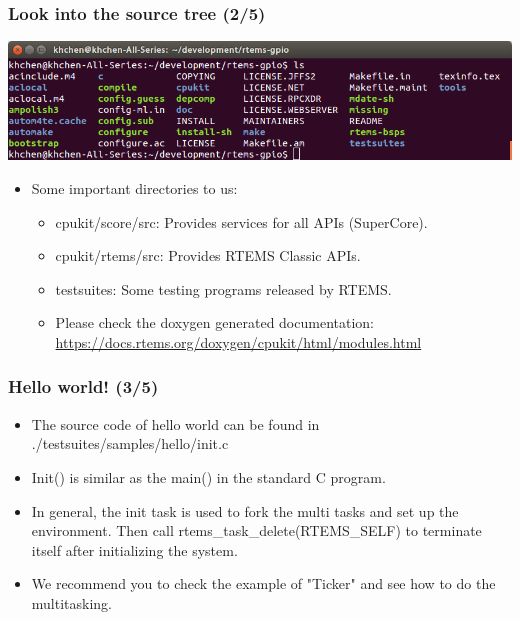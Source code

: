 \documentclass[t]{beamer}
\begin{document}
\begin{frame}
\frametitle{Look into the source tree (2/5)}
    \begin{center}
      \includegraphics[width=\textwidth]{sourcetree}
    \end{center}
\begin{itemize}
\item Some important directories to us:
\begin{itemize}
\item cpukit/score/src: Provides services for all APIs (SuperCore).
\item cpukit/rtems/src: Provides RTEMS Classic APIs.
\item testsuites: Some testing programs released by RTEMS.
\item Please check the doxygen generated documentation: \url{https://docs.rtems.org/doxygen/cpukit/html/modules.html}
\end{itemize}
\end{itemize}
\end{frame}

\begin{frame}
\frametitle{Hello world! (3/5)}
\begin{itemize}
\item The source code of hello world can be found in ./testsuites/samples/hello/init.c
\item Init() is similar as the main() in the standard C program.
\item In general, the init task is used to fork the multi tasks and set up the environment. Then call rtems\_task\_delete(RTEMS\_SELF) to terminate itself after initializing the system.
\item We recommend you to check the example of "Ticker" and see how to do the multitasking.

\end{itemize}
\end{frame}
\end{document}
